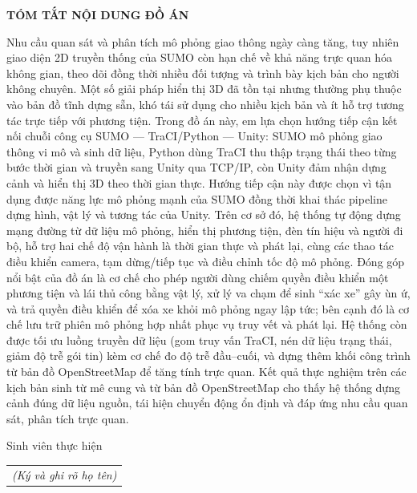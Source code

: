 \documentclass[../DoAn.tex]{subfiles}
\begin{document}
\begin{center}
    \Large{\textbf{TÓM TẮT NỘI DUNG ĐỒ ÁN}}\\
\end{center}
\vspace{1cm}

Nhu cầu quan sát và phân tích mô phỏng giao thông ngày càng tăng, tuy nhiên
giao diện 2D truyền thống của \gls{SUMO} còn hạn chế về khả năng trực quan hóa
không gian, theo dõi đồng thời nhiều đối tượng và trình bày kịch bản cho người
không chuyên. Một số giải pháp hiển thị 3D đã tồn tại nhưng thường phụ thuộc
vào bản đồ tĩnh dựng sẵn, khó tái sử dụng cho nhiều kịch bản và ít hỗ trợ tương
tác trực tiếp với phương tiện. Trong đồ án này, em lựa chọn hướng tiếp cận kết
nối chuỗi công cụ \gls{SUMO} --- \gls{TraCI}/Python --- Unity: \gls{SUMO} mô
phỏng giao thông vi mô và sinh dữ liệu, Python dùng \gls{TraCI} thu thập trạng
thái theo từng bước thời gian và truyền sang Unity qua TCP/IP, còn Unity đảm
nhận dựng cảnh và hiển thị 3D theo thời gian thực. Hướng tiếp cận này được chọn
vì tận dụng được năng lực mô phỏng mạnh của \gls{SUMO} đồng thời khai thác
pipeline dựng hình, vật lý và tương tác của Unity. Trên cơ sở đó, hệ thống tự
động dựng mạng đường từ dữ liệu mô phỏng, hiển thị phương tiện, đèn tín hiệu và
người đi bộ, hỗ trợ hai chế độ vận hành là thời gian thực và phát lại, cùng các
thao tác điều khiển camera, tạm dừng/tiếp tục và điều chỉnh tốc độ mô phỏng.
Đóng góp nổi bật của đồ án là cơ chế cho phép người dùng chiếm quyền điều khiển
một phương tiện và lái thủ công bằng vật lý, xử lý va chạm để sinh ``xác xe'' gây
ùn ứ, và trả quyền điều khiển để xóa xe khỏi mô phỏng ngay lập tức; bên cạnh đó là cơ chế lưu
trữ phiên mô phỏng hợp nhất phục vụ truy vết và phát lại. Hệ thống còn được tối
ưu luồng truyền dữ liệu (gom truy vấn \gls{TraCI}, nén dữ liệu trạng thái, giảm
độ trễ gói tin) kèm cơ chế đo độ trễ đầu--cuối, và dựng thêm khối công trình từ
bản đồ OpenStreetMap để tăng tính trực quan. Kết quả thực nghiệm
trên các kịch bản sinh từ mê cung và từ bản đồ OpenStreetMap cho thấy hệ thống
dựng cảnh đúng dữ liệu nguồn, tái hiện chuyển động ổn định và đáp ứng nhu cầu
quan sát, phân tích trực quan.

\begin{flushright}
Sinh viên thực hiện\\
\begin{tabular}{@{}c@{}}
\textit{(Ký và ghi rõ họ tên)}
\end{tabular}
\end{flushright}
\end{document}
